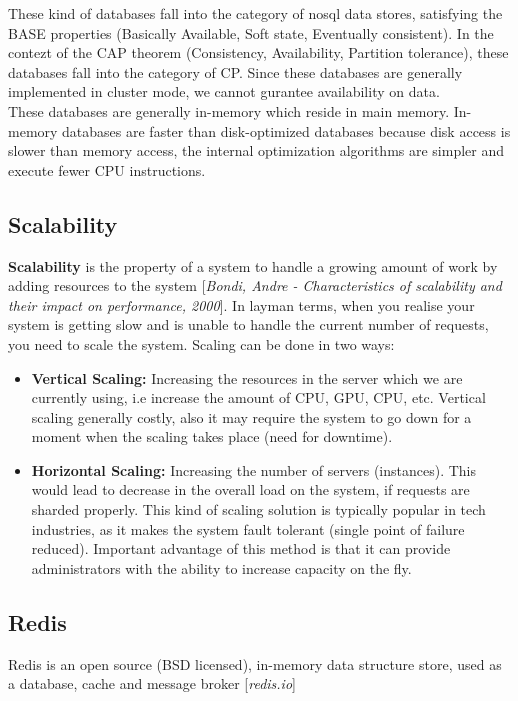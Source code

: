 \documentclass[11pt]{article}
\begin{document}
These kind of databases fall into the category of nosql data stores, satisfying the 
BASE properties (Basically Available, Soft state, Eventually consistent).
In the contezt of the CAP theorem (Consistency, Availability, Partition tolerance), these
databases fall into the category of CP. Since these databases are generally implemented
in cluster mode, we cannot gurantee availability on data.
\\

These databases are generally in-memory which reside in main memory. In-memory
databases are faster than disk-optimized databases because disk access is 
slower than memory access, the internal optimization algorithms 
are simpler and execute fewer CPU instructions.

\subsection*{Scalability}
\textbf{Scalability} is the property of a system to handle a growing amount of work
by adding resources to the system [\textit{Bondi, Andre - Characteristics of
scalability and their impact on performance, 2000}]. In layman terms, when
you realise your system is getting slow and is unable to handle
the current number of requests, you need to scale the system. Scaling 
can be done in two ways:

\begin{itemize}
    \item \textbf{Vertical Scaling:} Increasing the resources in the server
            which we are currently using, i.e increase the amount of CPU, GPU,
            CPU, etc. Vertical scaling generally costly, also it may
            require the system to go down for a moment when the scaling takes
            place (need for downtime).
    \item \textbf{Horizontal Scaling:} Increasing the number of servers (instances).
            This would lead to decrease in the overall load on the system, if requests
            are sharded properly. This kind of scaling solution is typically popular 
            in tech industries, as it makes the system fault tolerant (single point of
            failure reduced). Important advantage of this method is that it can provide
            administrators with the ability to increase capacity on the fly.
\end{itemize}

\subsection*{Redis}
Redis is an open source (BSD licensed), in-memory data structure store,
used as a database, cache and message broker [\textit{redis.io}] \cite{latexcompanion}
\end{document}
